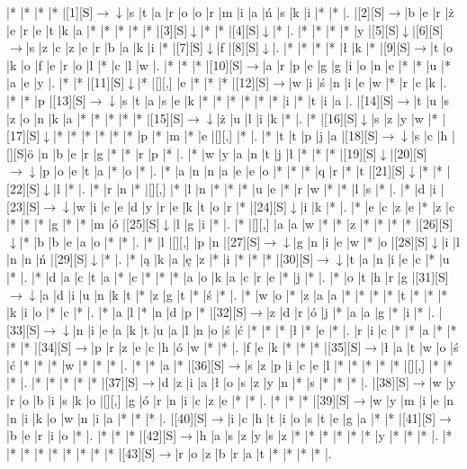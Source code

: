 \documentclass[11pt]{article}
\newcommand\drarr{$\rightarrow \!\!\!\!\! \downarrow$}
\newcommand\rarr{$\rightarrow$}
\newcommand\darr{$\downarrow$}
\begin{document}
\noindent\begin{Puzzle}{20}{31}|*	|*	|*	|*	|[1][S]\drarr	|s	|t	|a	|r	|o	|o	|r	|m	|i	|a	|ń	|s	|k	|i	|*	|*	|.
|[2][S]\rarr	|b	|e	|r	|ż	|e	|r	|e	|t	|k	|a	|*	|*	|*	|*	|*	|[3][S]\darr	|*	|*	|[4][S]\darr	|*	|.
|*	|*	|*	|*	|y	|[5][S]\darr	|[6][S]\rarr	|s	|z	|c	|z	|e	|r	|b	|a	|k	|i	|*	|[7][S]\darr	|f	|[8][S]\darr	|.
|*	|*	|*	|*	|ł	|k	|*	|[9][S]\rarr	|t	|o	|k	|o	|f	|e	|r	|o	|l	|*	|c	|l	|w	|.
|*	|*	|*	|[10][S]\rarr	|a	|r	|p	|e	|g	|g	|i	|o	|n	|e	|*	|*	|u	|*	|a	|e	|y	|.
|*	|*	|[11][S]\darr	|*	|[][,]{ }	|e	|*	|*	|*	|[12][S]\rarr	|w	|i	|ś	|n	|i	|e	|w	|*	|r	|c	|k	|.
|*	|*	|p	|[13][S]\drarr	|s	|t	|a	|s	|e	|k	|*	|*	|*	|*	|*	|*	|i	|*	|t	|i	|a	|.
|[14][S]\rarr	|t	|u	|s	|z	|o	|n	|k	|a	|*	|*	|*	|*	|*	|[15][S]\drarr	|ż	|u	|l	|i	|k	|*	|.
|*	|[16][S]\darr	|s	|z	|y	|w	|*	|[17][S]\darr	|*	|*	|*	|*	|*	|*	|p	|*	|m	|*	|e	|[][,]{ }	|*	|.
|*	|t	|t	|p	|j	|a	|[18][S]\drarr	|s	|c	|h	|[][S]ö	|n	|b	|e	|r	|g	|*	|*	|r	|p	|*	|.
|*	|w	|y	|a	|n	|t	|j	|ł	|*	|*	|*	|[19][S]\darr	|[20][S]\drarr	|p	|o	|e	|t	|a	|*	|o	|*	|.
|*	|a	|n	|n	|a	|e	|e	|o	|*	|*	|*	|q	|r	|*	|t	|[21][S]\darr	|*	|*	|[22][S]\darr	|l	|*	|.
|*	|r	|n	|*	|[][,]{ }	|*	|l	|n	|*	|*	|*	|u	|e	|*	|r	|w	|*	|*	|l	|s	|*	|.
|*	|d	|i	|[23][S]\drarr	|w	|i	|c	|e	|d	|y	|r	|e	|k	|t	|o	|r	|*	|[24][S]\darr	|i	|k	|*	|.
|*	|e	|c	|z	|e	|*	|z	|c	|*	|*	|*	|g	|*	|*	|m	|ó	|[25][S]\darr	|l	|g	|i	|*	|.
|*	|[][,]{ }	|a	|a	|w	|*	|*	|z	|*	|*	|*	|*	|[26][S]\darr	|*	|b	|b	|e	|a	|o	|*	|*	|.
|*	|l	|[][,]{ }	|p	|n	|[27][S]\drarr	|g	|n	|i	|e	|w	|*	|o	|[28][S]\darr	|i	|l	|n	|n	|ń	|[29][S]\darr	|*	|.
|*	|ą	|k	|a	|ę	|z	|*	|i	|*	|*	|*	|[30][S]\drarr	|t	|a	|n	|i	|e	|c	|*	|u	|*	|.
|*	|d	|a	|c	|t	|a	|*	|c	|*	|*	|*	|a	|o	|k	|a	|c	|r	|e	|*	|j	|*	|.
|*	|o	|t	|h	|r	|g	|[31][S]\drarr	|a	|d	|i	|u	|n	|k	|t	|*	|z	|g	|t	|*	|ś	|*	|.
|*	|w	|o	|*	|z	|a	|a	|*	|*	|*	|*	|t	|*	|*	|*	|k	|i	|o	|*	|c	|*	|.
|*	|a	|l	|*	|n	|d	|p	|*	|[32][S]\rarr	|z	|d	|r	|ó	|j	|*	|a	|a	|g	|*	|i	|*	|.
|[33][S]\drarr	|n	|i	|e	|a	|k	|t	|u	|a	|l	|n	|o	|ś	|ć	|*	|*	|*	|ł	|*	|e	|*	|.
|r	|i	|c	|*	|*	|a	|*	|*	|*	|*	|[34][S]\rarr	|p	|r	|z	|e	|c	|h	|ó	|w	|*	|*	|.
|f	|e	|k	|*	|*	|*	|[35][S]\rarr	|ł	|a	|t	|w	|o	|ś	|ć	|*	|*	|*	|w	|*	|*	|*	|.
|*	|*	|a	|*	|[36][S]\rarr	|s	|z	|p	|i	|c	|e	|l	|*	|*	|*	|*	|*	|[][,]{ }	|*	|*	|*	|.
|*	|*	|*	|*	|*	|[37][S]\rarr	|d	|z	|i	|a	|ł	|o	|s	|z	|y	|n	|*	|s	|*	|*	|*	|.
|[38][S]\rarr	|w	|y	|r	|o	|b	|i	|s	|k	|o	|[][,]{ }	|g	|ó	|r	|n	|i	|c	|z	|e	|*	|*	|.
|*	|*	|*	|[39][S]\rarr	|w	|y	|m	|i	|e	|n	|n	|i	|k	|o	|w	|n	|i	|a	|*	|*	|*	|.
|[40][S]\rarr	|i	|c	|h	|t	|i	|o	|s	|t	|e	|g	|a	|*	|*	|[41][S]\rarr	|b	|e	|r	|i	|o	|*	|.
|*	|*	|*	|[42][S]\rarr	|h	|a	|s	|z	|y	|s	|z	|*	|*	|*	|*	|*	|*	|y	|*	|*	|*	|.
|*	|*	|*	|*	|*	|*	|*	|*	|*	|[43][S]\rarr	|r	|o	|z	|b	|r	|a	|t	|*	|*	|*	|*	|.\end{Puzzle}
\end{document}
